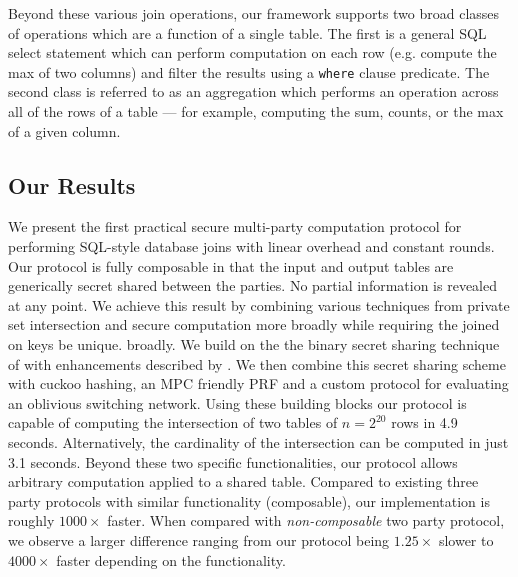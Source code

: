 \documentclass[11pt,letterpaper]{article}
\begin{document}
Beyond these various join operations, our framework supports two broad classes of operations which are a function of a single table. The first is a general SQL select statement which can perform computation on each row (e.g. compute the max of two columns) and filter the results using a \texttt{where} clause predicate. The second class is referred to as an aggregation which performs an operation across all of the rows of a table --- for example, computing the sum, counts, or the max of a given column. 
\subsection{Our Results}

We present the first practical secure multi-party computation protocol for performing SQL-style database joins with linear overhead and constant rounds. Our protocol is fully composable in that the input and output tables are generically secret shared between the parties. 
\iffullversion
	No partial information is revealed at any point. 
\fi
	We achieve this result by combining various techniques from private set intersection and secure computation more 
\iffullversion 
	broadly while requiring the joined on keys be unique.
\else
	broadly.
\fi
 We build on the the binary secret sharing technique of \cite{highthroughput} with enhancements described by \cite{aby3}. We then combine this secret sharing scheme with cuckoo hashing\cite{usenix:PSZ14}, an MPC friendly PRF\cite{lowmc} and a custom protocol for evaluating an oblivious switching network\cite{MS13}. Using these building blocks our protocol is capable of computing the intersection of two tables of $n=2^{20}$ rows in 4.9 seconds. 
\iffullversion 
	Alternatively, the cardinality of the intersection can be computed in just 3.1 seconds.
\fi
  Beyond these two specific functionalities, our protocol allows arbitrary computation applied to a shared table. Compared to existing three party protocols with similar functionality (composable), our implementation is roughly $1000\times$ faster. When compared with \emph{non-composable} two party protocol, we observe a larger difference ranging from our protocol being $1.25\times$ slower to $4000\times$ faster depending on the functionality. 
\end{document}
